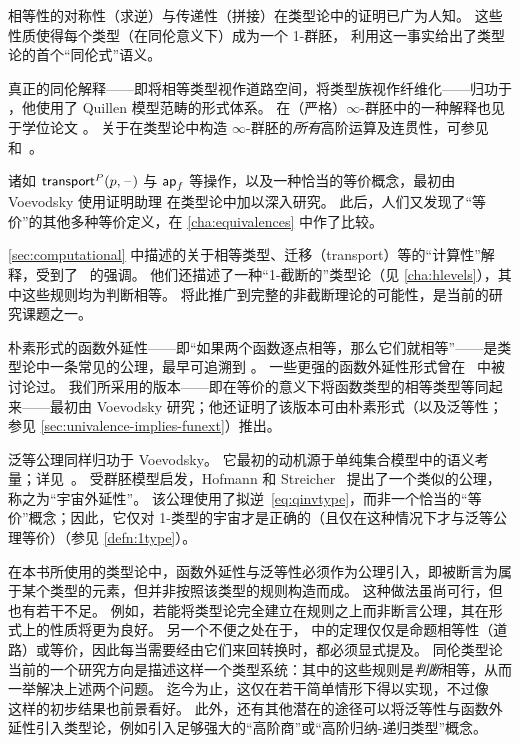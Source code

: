 相等性的对称性（求逆）与传递性（拼接）在类型论中的证明已广为人知。
这些性质使得每个类型（在同伦意义下）成为一个 1-群胚，\cite{hs:gpd-typethy} 利用这一事实给出了类型论的首个``同伦式''语义。

真正的同伦解释——即将相等类型视作道路空间，将类型族视作纤维化——归功于 \cite{AW}，他使用了 Quillen 模型范畴的形式体系。
在（严格）$\infty$-群胚中的一种解释也见于学位论文 \cite{mw:thesis}。
关于在类型论中构造 $\infty$-群胚的\emph{所有}高阶运算及连贯性，可参见~\cite{pll:wkom-type} 和~\cite{bg:type-wkom}。

%
诸如 $\mathsf{transport}^{P}(p,\mathord{\hspace{1pt}\text{--}\hspace{1pt}})$ 与 $\mathsf{ap}_{f}$ 等操作，以及一种恰当的等价概念，最初由 Voevodsky 使用证明助理 \Coq 在类型论中加以深入研究。
此后，人们又发现了``等价''的其他多种等价定义，在 \cref{cha:equivalences} 中作了比较。

\cref{sec:computational} 中描述的关于相等类型、迁移（transport）等的``计算性''解释，受到了~\cite{lh:canonicity} 的强调。
他们还描述了一种``1-截断的''类型论（见 \cref{cha:hlevels}），其中这些规则均为判断相等。
将此推广到完整的非截断理论的可能性，是当前的研究课题之一。

%
朴素形式的函数外延性——即``如果两个函数逐点相等，那么它们就相等''——是类型论中一条常见的公理，最早可追溯到 \cite{PM2}。
一些更强的函数外延性形式曾在~\cite{garner:depprod} 中被讨论过。
我们所采用的版本——即在等价的意义下将函数类型的相等类型等同起来——最初由 Voevodsky 研究；他还证明了该版本可由朴素形式（以及泛等性；参见 \cref{sec:univalence-implies-funext}）推出。

%
泛等公理同样归功于 Voevodsky。
它最初的动机源于单纯集合模型中的语义考量；详见~\cite{klv:ssetmodel}。
受群胚模型启发，Hofmann 和 Streicher~\cite{hs:gpd-typethy} 提出了一个类似的公理，称之为``宇宙外延性''。
该公理使用了拟逆~\eqref{eq:qinvtype}，而非一个恰当的``等价''概念；因此，它仅对 1-类型的宇宙才是正确的（且仅在这种情况下才与泛等公理等价）（参见 \cref{defn:1type}）。

在本书所使用的类型论中，函数外延性与泛等性必须作为公理引入，即被断言为属于某个类型的元素，但并非按照该类型的规则构造而成。
这种做法虽尚可行，但也有若干不足。
例如，若能将类型论完全建立在规则之上而非断言公理，其在形式上的性质将更为良好。
另一个不便之处在于， 中的定理仅仅是命题相等性（道路）或等价，因此每当需要经由它们来回转换时，都必须显式提及。
同伦类型论当前的一个研究方向是描述这样一个类型系统：其中的这些规则是\emph{判断}相等，从而一举解决上述两个问题。
迄今为止，这仅在若干简单情形下得以实现，不过像~\cite{lh:canonicity} 这样的初步结果也前景看好。
此外，还有其他潜在的途径可以将泛等性与函数外延性引入类型论，例如引入足够强大的``高阶商''或``高阶归纳-递归类型''概念。

